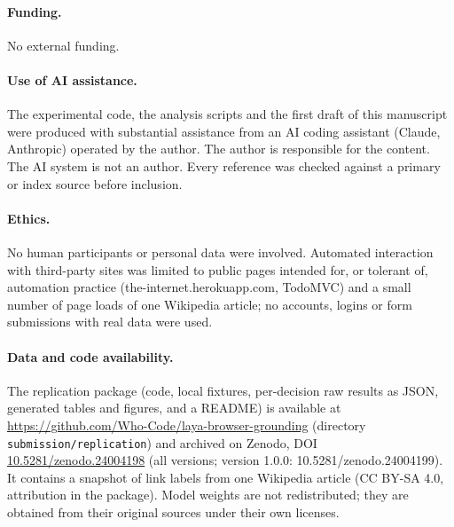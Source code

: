 \documentclass[11pt,a4paper]{article}
\begin{document}
\paragraph{Funding.} No external funding.
\paragraph{Use of AI assistance.} The experimental code, the analysis scripts and the first draft of this manuscript were produced with substantial assistance from an AI coding assistant (Claude, Anthropic) operated by the author. The author is responsible for the content. The AI system is not an author. Every reference was checked against a primary or index source before inclusion.
\paragraph{Ethics.} No human participants or personal data were involved. Automated interaction with third-party sites was limited to public pages intended for, or tolerant of, automation practice (the-internet.herokuapp.com, TodoMVC) and a small number of page loads of one Wikipedia article; no accounts, logins or form submissions with real data were used.
\paragraph{Data and code availability.} The replication package (code, local fixtures, per-decision raw results as JSON, generated tables and figures, and a README) is available at \url{https://github.com/Who-Code/laya-browser-grounding} (directory \texttt{submission/replication}) and archived on Zenodo, DOI \href{https://doi.org/10.5281/zenodo.24004198}{10.5281/zenodo.24004198} (all versions; version 1.0.0: 10.5281/zenodo.24004199). It contains a snapshot of link labels from one Wikipedia article (CC BY-SA 4.0, attribution in the package). Model weights are not redistributed; they are obtained from their original sources under their own licenses.
\end{document}
